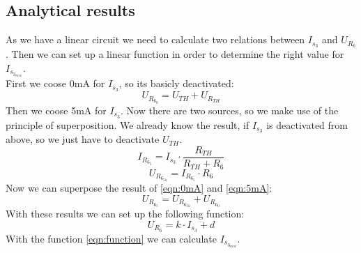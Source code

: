 \documentclass[a4paper]{article}
\begin{document}
      \subsection{Analytical results}
      As we have a linear circuit we need to calculate two relations between $I_{s_3}$ and $U_{R_6}$.
      Then we can set up a linear function in order to determine the right value for $I_{s_{3_{new}}}$.\\
      First we coose 0mA for $I_{s_3}$, so its basicly deactivated:
      \begin{equation}
            U_{R_{6_0}} = U_{TH} + U_{R_{TH}}
      \end{equation}\label{eqn:0mA}
      Then we coose 5mA for $I_{s_3}$. Now there are two sources, so we make use of the principle of
      superposition. We already know the result, if $I_{s_3}$ is deactivated from above, so we 
      just have to deactivate $U_{TH}$.
      \begin{equation*}
            I_{R_{6_5}} = I_{s_3} \cdot \frac{R_{TH}}{R_{TH} + R_6}
      \end{equation*}
      \begin{equation}
            U_{R_{6_{5u}}} = I_{R_{6_5}} \cdot R_6
      \end{equation}\label{eqn:5mA}
      Now we can superpose the result of \ref{eqn:0mA} and \ref{eqn:5mA}:
      \begin{equation}
            U_{R_{6_5}} = U_{R_{6_{5u}}} + U_{R_{6_0}}
      \end{equation}
      With these results we can set up the following function:
      \begin{equation}\label{eqn:function}
            U_{R_{6}} = k \cdot I_{s_{3}} + d
      \end{equation}
      With the function \ref{eqn:function} we can calculate $I_{s_{3_{new}}}$.
\end{document}
